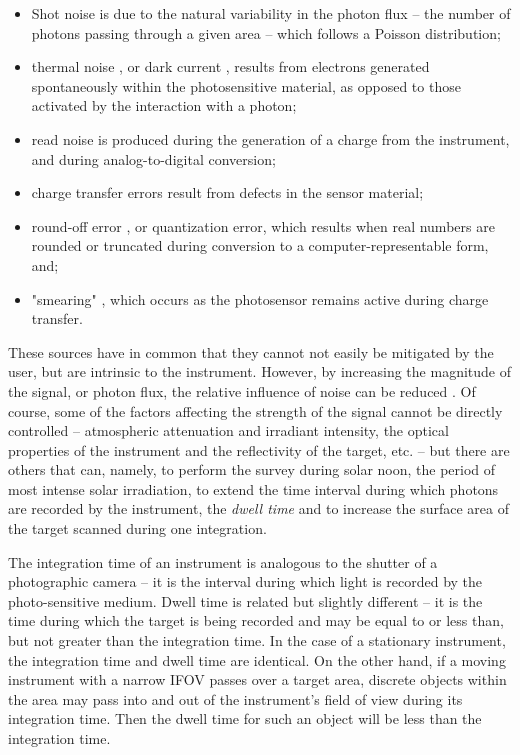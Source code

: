 \documentclass[10pt]{article}
\begin{document}
\begin{itemize}
\item Shot noise \cite{Barducci2007} is due to the natural variability in the photon flux -- the number of photons passing through a given area -- which follows a Poisson distribution;
\item thermal noise \cite{Barducci2007}, or dark current \cite{Rogass2011}, results from electrons generated spontaneously within the photosensitive material, as opposed to those activated by the interaction with a photon;
\item read noise \cite{Barducci2007} is produced during the generation of a charge from the instrument, and during analog-to-digital conversion;
\item charge transfer errors \cite{Barducci2007} result from defects in the sensor material;
\item round-off error \cite{Barducci2007}, or quantization error, which results when real numbers are rounded or truncated during conversion to a computer-representable form, and;
\item "smearing" \cite{Barducci2007,Ruyten1999}, which occurs as the photosensor remains active during charge transfer.
\end{itemize}

These sources have in common that they cannot not easily be mitigated by the user, but are intrinsic to the instrument. However, by increasing the magnitude of the signal, or photon flux, the relative influence of noise can be reduced \cite{Dor2012}. Of course, some of the factors affecting the strength of the signal cannot be directly controlled -- atmospheric attenuation and irradiant intensity, the optical properties of the instrument and the reflectivity of the target, etc. -- but there are others that can, namely, to perform the survey during solar noon, the period of most intense solar irradiation, to extend the time interval during which photons are recorded by the instrument, the \emph{dwell time} \cite{Gupta2018,Goetz1985,Dor2012} and to increase the surface area of the target scanned during one integration.

The integration time of an instrument is analogous to the shutter of a photographic camera -- it is the interval during which light is recorded by the photo-sensitive medium. Dwell time is related but slightly different -- it is the time during which the target is being recorded and may be equal to or less than, but not greater than the integration time. In the case of a stationary instrument, the integration time and dwell time are identical. On the other hand, if a moving instrument with a narrow IFOV passes over a target area, discrete objects within the area may pass into and out of the instrument's field of view during its integration time. Then the dwell time for such an object will be less than the integration time.
\end{document}
